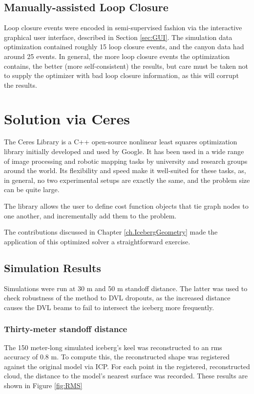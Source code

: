 \subsection{Manually-assisted Loop Closure}

Loop closure events were encoded in semi-supervised fashion via the interactive graphical user interface, described in Section \ref{sec:GUI}. The simulation data optimization contained roughly 15 loop closure events, and the canyon data had around 25 events. In general, the more loop closure events the optimization contains, the better (more self-consistent) the results, but care must be taken not to supply the optimizer with bad loop closure information, as this will corrupt the results.

\section{Solution via Ceres}

The Ceres Library is a C++ open-source nonlinear least squares optimization library initially developed and used by Google. It has been used in a wide range of image processing and robotic mapping tasks by university and research groups around the world. Its flexibility and speed make it well-suited for these tasks, as, in general, no two experimental setups are exactly the same, and the problem size can be quite large.  

The library allows the user to define cost function objects that tie graph nodes to one another, and incrementally add them to the problem. 

The contributions discussed in Chapter \ref{ch.IcebergGeometry} made the application of this optimized solver a straightforward exercise. 

\subsection{Simulation Results}

Simulations were run at 30 m and 50 m standoff distance. The latter was used to check robustness of the method to DVL dropouts, as the increased distance causes the DVL beams to fail to intersect the iceberg more frequently.

\subsubsection{Thirty-meter standoff distance}

The 150 meter-long simulated iceberg's keel was reconstructed to an rms accuracy of 0.8 m. To compute this, the reconstructed shape was registered against the original model via ICP. For each point in the registered, reconstructed cloud, the distance to the model's nearest surface was recorded. These results are shown in Figure \ref{fig:RMS}


